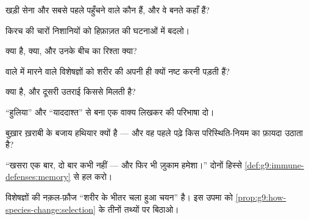 \begin{exercise}[$\star$]\label{exo:g9:immune-defenses:1}
खड़ी सेना और सबसे पहले पहुँचने वाले कौन हैं, और वे बनते कहाँ हैं?
\end{exercise}

\begin{exercise}[$\star$]\label{exo:g9:immune-defenses:2}
किरच की चारों निशानियों को हिफ़ाज़त की घटनाओं में बदलो।
\end{exercise}

\begin{exercise}[$\star$]\label{exo:g9:immune-defenses:3}
 क्या है,  क्या, और उनके बीच का रिश्ता क्या?
\end{exercise}

\begin{exercise}[$\star$]\label{exo:g9:immune-defenses:4}
 वाले  में मारने वाले विशेषज्ञों को शरीर की अपनी ही
 क्यों नष्ट करनी पड़ती हैं?
\end{exercise}

\begin{exercise}[$\star$]\label{exo:g9:immune-defenses:5}
 क्या है, और दूसरी उतराई किससे मिलती है?
\end{exercise}

\begin{exercise}[$\star$]\label{exo:g9:immune-defenses:6}
``हुलिया'' और ``याददाश्त'' से बना एक वाक्य लिखकर  की परिभाषा
दो।
\end{exercise}

\begin{exercise}[$\star\star$]\label{exo:g9:immune-defenses:7}
बुख़ार ख़राबी के बजाय हथियार क्यों है --- और वह पहले पढ़े किस
परिस्थिति-नियम का फ़ायदा उठाता है?
\end{exercise}

\begin{exercise}[$\star\star$]\label{exo:g9:immune-defenses:8}
``खसरा एक बार, दो बार कभी नहीं --- और फिर भी ज़ुकाम हमेशा।'' दोनों
हिस्से \cref{def:g9:immune-defenses:memory} से हल करो।
\end{exercise}

\begin{exercise}[$\star\star$]\label{exo:g9:immune-defenses:9}
विशेषज्ञों की नक़ल-फ़ौज ``शरीर के भीतर चला हुआ चयन'' है। इस उपमा को
\cref{prop:g9:how-species-change:selection} के तीनों तथ्यों पर बिठाओ।
\end{exercise}

